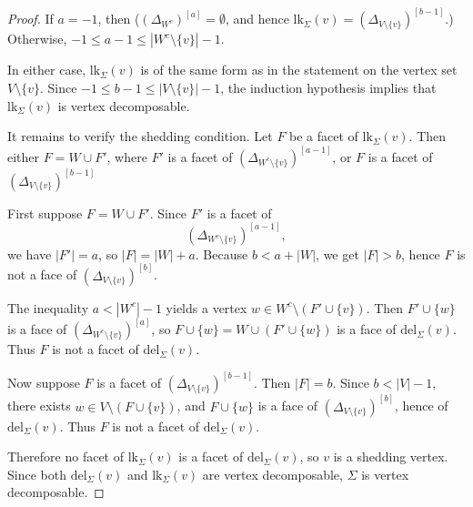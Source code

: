 \documentclass[10pt,a4paper]{amsart}
\newcommand{\del}{{\mathrm{del}}}
\newcommand{\lk}{{\mathrm{lk}}}
\begin{document}
\begin{proof}
If $a=-1$, then
($(\Delta_{W^c})^{[a]}=\emptyset$, and hence $\lk_\Sigma(v)=(\Delta_{V\setminus\{v\}})^{[b-1]}$.) Otherwise, $-1\le a-1\le |W^c\setminus\{v\}|-1$.

In either case, $\lk_\Sigma(v)$ is of the same form as in the statement on the vertex set $V\setminus\{v\}$. 
Since $-1\le b-1\le |V\setminus\{v\}|-1$, the induction hypothesis implies that $\lk_\Sigma(v)$ is vertex decomposable.

It remains to verify the shedding condition.
Let $F$ be a facet of $\lk_\Sigma(v)$. 
Then either $F=W\cup F'$, where $F'$ is a facet of  $(\Delta_{W^c\setminus\{v\}})^{[a-1]}$, or $F$ is a facet of $(\Delta_{V\setminus\{v\}})^{[b-1]}$

First suppose $F=W\cup F'$. Since $F'$ is a facet of
\[
(\Delta_{W^c\setminus\{v\}})^{[a-1]},
\]
we have $|F'|=a$, so $|F|=|W|+a$. Because $b<a+|W|$, we get $|F|>b$, hence $F$ is not a face of $(\Delta_{V\setminus\{v\}})^{[b]}$.

The inequality $a<|W^c|-1$ yields a vertex $w\in W^c\setminus(F'\cup\{v\})$. Then $F'\cup\{w\}$ is a face of $(\Delta_{W^c\setminus\{v\}})^{[a]}$, so $F\cup\{w\}=W\cup(F'\cup\{w\})$ is a face of $\del_\Sigma(v)$. Thus $F$ is not a facet of $\del_\Sigma(v)$.

Now suppose $F$ is a facet of $(\Delta_{V\setminus\{v\}})^{[b-1]}$. Then $|F|=b$. Since $b<|V|-1$, there exists $w\in V\setminus(F\cup\{v\})$, and $F\cup\{w\}$ is a face of $(\Delta_{V\setminus\{v\}})^{[b]}$, hence of $\del_\Sigma(v)$. Thus $F$ is not a facet of $\del_\Sigma(v)$.

Therefore no facet of $\lk_\Sigma(v)$ is a facet of $\del_\Sigma(v)$, so $v$ is a shedding vertex. Since both $\del_\Sigma(v)$ and $\lk_\Sigma(v)$ are vertex decomposable, $\Sigma$ is vertex decomposable.
\end{proof}
\end{document}
